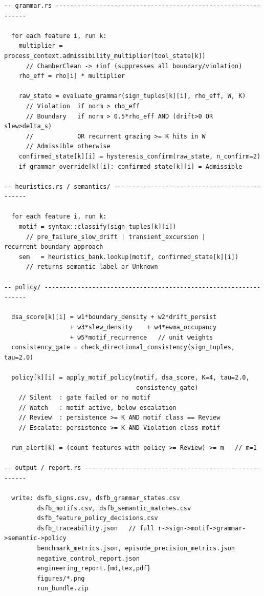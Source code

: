 \documentclass[11pt,letterpaper]{article}
\theoremstyle{scresult}
\begin{document}
\begin{verbatim}
-- grammar.rs --------------------------------------------------------------

  for each feature i, run k:
    multiplier = process_context.admissibility_multiplier(tool_state[k])
      // ChamberClean -> +inf (suppresses all boundary/violation)
    rho_eff = rho[i] * multiplier

    raw_state = evaluate_grammar(sign_tuples[k][i], rho_eff, W, K)
      // Violation  if norm > rho_eff
      // Boundary   if norm > 0.5*rho_eff AND (drift>0 OR slew>delta_s)
      //            OR recurrent grazing >= K hits in W
      // Admissible otherwise
    confirmed_state[k][i] = hysteresis_confirm(raw_state, n_confirm=2)
    if grammar_override[k][i]: confirmed_state[k][i] = Admissible

-- heuristics.rs / semantics/ ----------------------------------------------

  for each feature i, run k:
    motif = syntax::classify(sign_tuples[k][i])
      // pre_failure_slow_drift | transient_excursion | recurrent_boundary_approach
    sem   = heuristics_bank.lookup(motif, confirmed_state[k][i])
      // returns semantic label or Unknown

-- policy/ -----------------------------------------------------------------

  dsa_score[k][i] = w1*boundary_density + w2*drift_persist
                  + w3*slew_density    + w4*ewma_occupancy
                  + w5*motif_recurrence   // unit weights
  consistency_gate = check_directional_consistency(sign_tuples, tau=2.0)

  policy[k][i] = apply_motif_policy(motif, dsa_score, K=4, tau=2.0,
                                    consistency_gate)
    // Silent  : gate failed or no motif
    // Watch   : motif active, below escalation
    // Review  : persistence >= K AND motif class == Review
    // Escalate: persistence >= K AND Violation-class motif

  run_alert[k] = (count features with policy >= Review) >= m   // m=1

-- output / report.rs ------------------------------------------------------

  write: dsfb_signs.csv, dsfb_grammar_states.csv
         dsfb_motifs.csv, dsfb_semantic_matches.csv
         dsfb_feature_policy_decisions.csv
         dsfb_traceability.json   // full r->sign->motif->grammar->semantic->policy
         benchmark_metrics.json, episode_precision_metrics.json
         negative_control_report.json
         engineering_report.{md,tex,pdf}
         figures/*.png
         run_bundle.zip
\end{verbatim}
\end{document}
